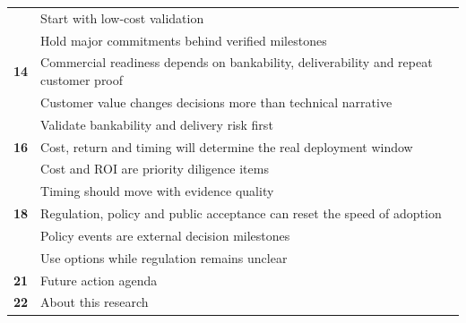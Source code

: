 \documentclass[10pt,a4paper]{article}
\begin{document}
\begin{tabularx}{\linewidth}{p{14mm}Y}
 & {\scriptsize\color{BOMuted} Start with low-cost validation} \\[1pt]
 & {\scriptsize\color{BOMuted} Hold major commitments behind verified milestones} \\[1pt]
\textcolor{BOGreen}{\bfseries 14} & Commercial readiness depends on bankability, deliverability and repeat customer proof \\[5pt]
 & {\scriptsize\color{BOMuted} Customer value changes decisions more than technical narrative} \\[1pt]
 & {\scriptsize\color{BOMuted} Validate bankability and delivery risk first} \\[1pt]
\textcolor{BOGreen}{\bfseries 16} & Cost, return and timing will determine the real deployment window \\[5pt]
 & {\scriptsize\color{BOMuted} Cost and ROI are priority diligence items} \\[1pt]
 & {\scriptsize\color{BOMuted} Timing should move with evidence quality} \\[1pt]
\textcolor{BOGreen}{\bfseries 18} & Regulation, policy and public acceptance can reset the speed of adoption \\[5pt]
 & {\scriptsize\color{BOMuted} Policy events are external decision milestones} \\[1pt]
 & {\scriptsize\color{BOMuted} Use options while regulation remains unclear} \\[1pt]
\textcolor{BOGreen}{\bfseries 21} & Future action agenda \\[5pt]
\textcolor{BOGreen}{\bfseries 22} & About this research \\[5pt]
\end{tabularx}
\clearpage
\end{document}
